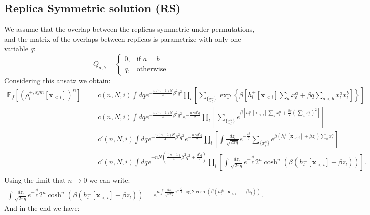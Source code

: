\documentclass[aps,physrev,10pt,floatfix,longbibliography,nofootinbib,reprint]{revtex4-2}
\begin{document}
\subsection{Replica Symmetric solution (RS)}
We assume that the overlap between the replicas symmetric under permutations, and the matrix of the overlaps between replicas is parametrize with only one variable $q$:
$$
Q_{a,b}=\begin{cases}
			0, & \text{if $a=b$}\\
            q, & \text{otherwise}
		 \end{cases}
$$
Considering this ansatz we obtain:
\begin{eqnarray}
\mathbb{E}_{\underline{J}}\left[(\rho_i^{\pm, sym}[\mathbf{x}_{<i}])^n \right] & = & 
c(n,N,i)
\int dq e^{-\frac{n(n-1)N}{4}\beta^2 q^2}
\prod_{l} \left[
\sum_{\{\underline{x}^{a}_l\}} 
\exp\left\{\beta \left[
h_l^{\pm}[\mathbf{x}_{<i}] \sum_{a} x_l^{a} +\beta q \sum_{a<b} x_l^{a} x_l^{b} \right]  \right\} 
\right] \\
& = &
c(n,N,i)
\int dq e^{-\frac{n(n-1)N}{4}\beta^2 q^2}
e^{-\frac{nN\beta^2 q}{2}}
\prod_{l} \left[
\sum_{\{\underline{x}^{a}_l\}} 
e^{\beta \left[
h_l^{\pm}[\mathbf{x}_{<i}] \sum_{a} x_l^{a} + \frac{\beta q}{2} \left(\sum_{a} x_l^{a} \right)^2 \right]} 
\right]\\
& = &
c'(n,N,i)
\int dq e^{-\frac{n(n-1)N}{4}\beta^2 q^2}
e^{-\frac{nN\beta^2 q}{2}}
\prod_{l} \left[\int \frac{dz_l}{\sqrt{2\pi q}} e^{-\frac{z_l^2}{q}}
\sum_{\{\underline{x}^{a}_l\}} 
e^{\beta \left(
h_l^{\pm}[\mathbf{x}_{<i}] +\beta z_l \right) \sum_{a} x_l^{a}} 
\right]\\
& = &
c'(n,N,i)
\int dq e^{-nN\left(\frac{(n-1)}{4}\beta^2 q^2 +\frac{\beta^2 q}{2}\right)}
\prod_{l} \left[\int \frac{dz_l}{\sqrt{2\pi q}} e^{-\frac{z_l^2}{q}}
2^n\cosh^n \left(\beta \left(
h_l^{\pm}[\mathbf{x}_{<i}] +\beta z_l \right)\right) 
\right].\\
\end{eqnarray}
Using the limit that $n\rightarrow 0$ we can write:
\begin{eqnarray}
\int \frac{dz_l}{\sqrt{2\pi q}} e^{-\frac{z_l^2}{q}}
2^n\cosh^n \left(\beta \left(
h_l^{\pm}[\mathbf{x}_{<i}] +\beta z_l \right)\right) = e^{n \int \frac{dz_l}{\sqrt{2\pi q}} e^{-\frac{z_l^2}{q}}
\log 2\cosh \left(\beta \left(
h_l^{\pm}[\mathbf{x}_{<i}] +\beta z_l \right)\right)}.
\label{eq:gauss_n0}
\end{eqnarray}
And in the end we have:
\end{document}
